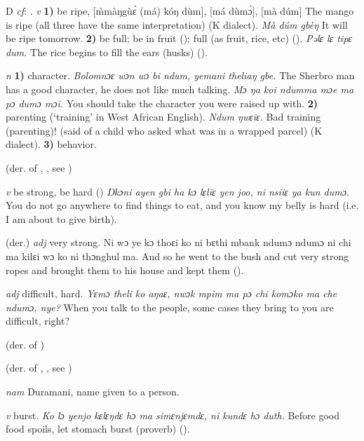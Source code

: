\begin{letter}{D}
 \textit{cf}: . \textit{v} \textbf{1)} be ripe, [m̀màŋgùɛ̀ (má) kóŋ dùm], [má dùmɔ̀], [mà dúm] The mango is ripe (all three have the same interpretation) (K dialect). \textit{Mà dúm gbèŋ} It will be ripe tomorrow. \textbf{2)} be full; be in fruit (\citealt{Pichl1967}); full (as fruit, rice, etc) (\citealt{Sumner1921}). \textit{Pəlɛ lɛ tipɛ dum.} The rice begins to fill the ears (husks) (\citealt{Pichl1967}). 

 \textit{n} \textbf{1)} character. \textit{Bolomnɔɛ wɔn wɔ bi ndum, yemani theliaŋ gbe.} The Sherbro man has a good character, he does not like much talking. \textit{Mɔ ŋa koi ndumma mɔe ma pɔ dumɔ mɔi.} You should take the character you were raised up with. \textbf{2)} parenting (‘training' in West African English). \textit{Ndum ŋwɛiɛ.} Bad training (parenting)! (said of a child who asked what was in a wrapped parcel) (K dialect). \textbf{3)} behavior. 

 (der. of , , see ) 

 \textit{v} be strong, be hard (\citealt{Sumner1921}) \textit{Ŋkɔni ayen gbi ha kɔ lɛliɛ yen joo, ni nsiiɛ ya kun dumɔ.} You do not go anywhere to find things to eat, and you know my belly is hard (i.e. I am about to give birth).

 (der.) \textit{adj} very strong. Ni wɔ ye kɔ thoɛi ko ni bɛthi mbank ndumɔ ndumɔ ni chi ma kilɛi wɔ ko ni thɔnghul ma. And so he went to the bush and cut very strong ropes and brought them to his house and kept them (\citealt{Sumner1921}). 

 \textit{adj} difficult, hard. \textit{Yɛmɔ theli ko aŋaɛ, nwɔk mpim ma pɔ chi komɔko ma che ndumɔ, nye?} When you talk to the people, some cases they bring to you are difficult, right?

 (der. of ) 

 (der. of , , see ) 

 \textit{nam} Duramani, name given to a person. 

 \textit{v} burst. \textit{Ko lɔ yenjo kɛlɛŋdɛ hɔ ma simɛnjɛmdɛ, ni kundɛ hɔ duth.} Before good food spoils, let stomach burst (proverb) (\citealt{TISLL1979}). 

\end{letter}
